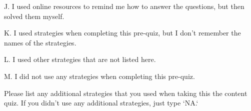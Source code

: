 \documentclass{ximera}
\begin{document}
\begin{question}
\begin{question}
    J. I used online resources to remind me how to answer the questions, but then solved them myself.

    \begin{multipleChoice}
    \end{multipleChoice}
    
\end{question}
\begin{question}    
    
    K. I used strategies when completing this pre-quiz, but I don't remember the names of the strategies.

    \begin{multipleChoice}
    \end{multipleChoice}
    
\end{question}
\begin{question}    
    
    L. I used other strategies that are not listed here.

    \begin{multipleChoice}
    \end{multipleChoice}
    
\end{question}
\begin{question}    
    
    M. I did not use any strategies when completing this pre-quiz.

    \begin{multipleChoice}
    \end{multipleChoice}

\end{question}
\end{question}

\begin{question}
    Please list any additional strategies that you used when taking this the content quiz. If you didn't use any additional strategies, just type `NA.`
   \begin{freeResponse}
   \end{freeResponse}
\end{question}

%
\end{document}
